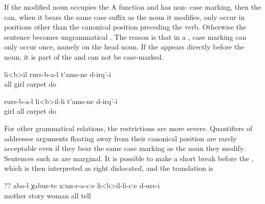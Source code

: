 If the modified noun occupies the A function and has non- case marking, then the  can, when it bears the same case suffix as the noun it modifies, only occur in positions other than the canonical position preceding the verb. Otherwise the sentence becomes ungrammatical . The reason is that in a , case marking can only occur once, namely on the head noun. If the  appears directly before the noun, it is part of the  and can not be case-marked.

%
\begin{exe}
	\ex	\label{ex:All girls used to make carpets@14}
	\begin{xlist}
		\ex	\label{ex:All girls used to make carpets@14a}
		\gll	li<b>il	rurs-b-a-l	t'ams-ne	d-irq'-i\\
			all	girl	carpet	do\\
		\glt	{}
	
		\ex	\label{ex:All girls used to make carpets@14b}
		\gll	rurs-b-a-l	li<b>il-li	t'ams-ne	d-irq'-i\\
			girl	all	carpet	do\\
		\glt	{}
		
\ex 	{}	\label{ex:All girls used to make carpets@14c}
		
	\end{xlist}
\end{exe}

For other grammatical relations, the restrictions are more severe. Quantifiers of addressee arguments floating away from their canonical position are rarely acceptable even if they bear the same case marking as the noun they modify. Sentences such as  are marginal. It is possible to make a short break before the , which is then interpreted as right dislocated, and the translation is 
%
\begin{exe}
	\ex	\label{ex:Mother told the stories to all women@15}
	\gll	?? 	aba-l	χabur-te	xːun-r-a-cːe	li<b>il-li-cːe	d-urs-i\\	
		{}	mother	story	woman	all	tell\\
	\glt	{}
\end{exe}

